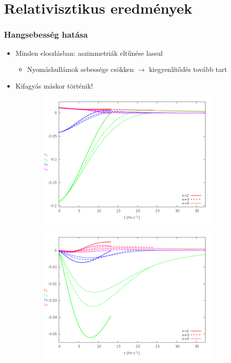 \documentclass{beamer}
\begin{document}
\section{Relativisztikus eredmények}
\begin{frame}
\frametitle{Hangsebesség hatása}
\begin{center}
\begin{itemize}
\setlength{\itemsep}{12pt}
\item<1-> Minden eloszlásban: aszimmetriák eltűnése lassul
\vspace{8pt}
\begin{itemize}
\item<1-> Nyomáshullámok sebessége csökken $\rightarrow$ kiegyenlítődés tovább tart
\end{itemize}
\item<2-> Kifagyás máskor történik!
\end{itemize}
\begin{figure}[H]
	\centering
    \begin{subfigure}[b]{0.49\textwidth}
    		\includegraphics[width=\textwidth]{pic/res/rel/eps_kappa_n}
	\end{subfigure}
	\begin{subfigure}[b]{0.49\textwidth}
        	\includegraphics[width=\textwidth]{pic/res/rel/eps_kappa_v}

\end{subfigure}
\end{figure}
\end{center}
\end{frame}
\end{document}
